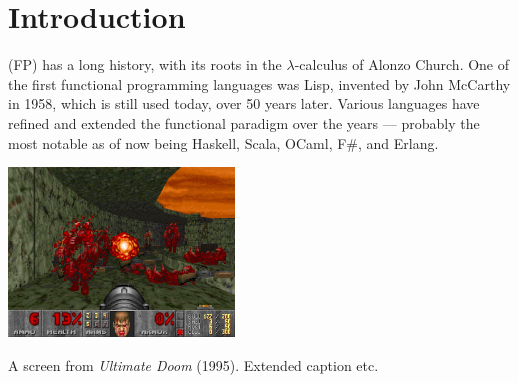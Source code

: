 \chapter[Introduction]{Introduction}
\label{ch:intro}


 (FP) has a long history, with its roots in the $\lambda$-calculus of Alonzo Church. One of the first functional programming languages was Lisp, invented by John McCarthy in 1958, which is still used today, over 50 years later. Various languages have refined and extended the functional paradigm over the years --- probably the most notable as of now being Haskell, Scala, OCaml, F\#, and Erlang.

\begin{marginfigure}
	\includegraphics[width=6cm]{res/doom/doom.png}
	\caption[A screen from \emph{Ultimate Doom}.]{A screen from \emph{Ultimate Doom} (1995). Extended caption etc.}
	\label{fig:doom}
\end{marginfigure}

\lipsum[1]

\lipsum[4]

